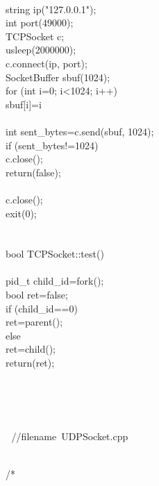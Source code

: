 \documentclass{article}
\begin{document}
 {
\\
     string ip("127.0.0.1");
\\
     int port(49000);
\\
     TCPSocket c;
\\
     usleep(2000000);
\\
     c.connect(ip, port);
\\
     SocketBuffer sbuf(1024);
\\
     for (int i=0; i<1024; i++) {
\\
         sbuf[i]=i%
\\
     }
\\
     int sent_bytes=c.send(sbuf, 1024);
\\
     if (sent_bytes!=1024) {
\\
                 c.close();
\\
         return(false);
\\
         }
\\
     c.close();
\\
     exit(0);
\\
 }
\\
 
\\
 bool TCPSocket::test()
\\
 {
\\
     pid_t child_id=fork();
\\
     bool ret=false;
\\
     if (child_id==0)
\\
         ret=parent();
\\
     else
\\
         ret=child();
\\
     return(ret);
\\
 }
\\
\strut\\
\strut\goodbreak
{}\strut\nopagebreak\\
 
\hbox{//$$filename UDPSocket.cpp}\strut\\
\hbox{/*}
\end{document}
